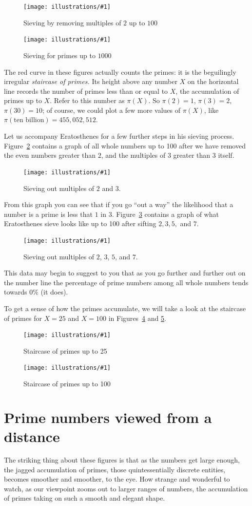\documentclass[openany]{book}
\newcommand{\ill}[3]{%
   \begin{figure}[H]%
   \vspace{-2ex}
   \centering%
   \texttt{[image: illustrations/\#1]}%
   \caption{#3}%
   \vspace{-2ex}
    \end{figure}}
\theoremstyle{plain}
\theoremstyle{definition}
\begin{document}
\ill{sieve_2_100}{.8}{Sieving by removing multiples of $2$ up to $100$\label{fig:sieve_2_100}}
\ill{sieve1000}{.8}{Sieving for primes up to $1000$}

The red curve in these figures actually counts the primes: it is the
beguilingly irregular {\em staircase of primes.}  Its height above any
number $X$ on the horizontal line records the number of primes less
than or equal to $X$, the accumulation of primes up to $X$.  Refer to
this number as $\pi(X)$. So $\pi(2)=1$, $\pi(3) = 2$, $\pi(30) = 10$;
of course, we could plot a few more values of $\pi(X)$, like
$\pi(\text{ten billion}) = 455,052,512$.


Let us accompany Eratosthenes for a few further steps in his sieving
process.  Figure~\ref{fig:sieve3_100} contains a graph of all whole
numbers up to 100 after we have removed the even numbers greater than
$2$, and the multiples of $3$ greater than $3$ itself.


\ill{sieves3_100}{.7}{Sieving out multiples of $2$ and $3$.\label{fig:sieve3_100}}


From this graph you can see that if you go ``out a way'' the
likelihood that a number is a prime is less that $1$ in $3
$. Figure~\ref{fig:sieve7_100} contains a graph of what Eratosthenes
sieve looks like up to 100 after sifting $2,3,5,$ and $7$.



\ill{sieves7_100}{.7}{Sieving out multiples of $2$, $3$, $5$, and $7$.\label{fig:sieve7_100}}


This data may begin to suggest to you that as you go further and
further out on the number line the percentage of prime numbers among
all whole numbers tends towards $0\%$ (it does).


To get a sense of how the primes accumulate, we will take a look at
the staircase of primes for $X= 25$ and $X=100$ in Figures~\ref{fig:staircase25}
and \ref{fig:staircase100a}.

\ill{prime_pi_25_aspect1}{.8}{Staircase of primes up to 25\label{fig:staircase25}}
\ill{prime_pi_100_aspect1}{.8}{Staircase of primes up to 100\label{fig:staircase100a}}



\chapter{Prime numbers viewed from a distance}
The striking thing about these figures is that as the numbers get
large enough, the jagged accumulation of primes, those
quintessentially discrete entities, becomes smoother and smoother, to
the eye. How strange and wonderful to watch, as our viewpoint zooms
out to larger ranges of numbers, the accumulation of primes taking on
such a smooth and elegant shape.
\end{document}
